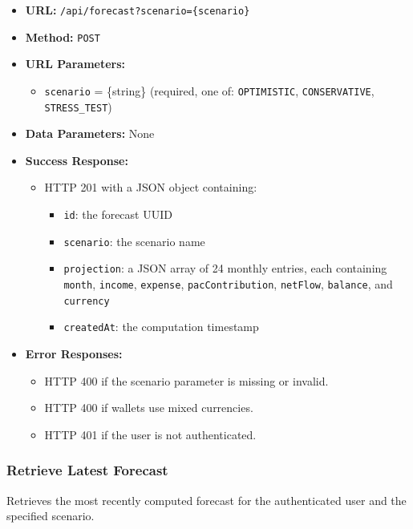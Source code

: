 \begin{itemize}
    \item \textbf{URL:} \texttt{/api/forecast?scenario=\{scenario\}}
    \item \textbf{Method:} \texttt{POST}
    \item \textbf{URL Parameters:}
    \begin{itemize}
        \item \texttt{scenario} = \{string\} (required, one of: \texttt{OPTIMISTIC}, \texttt{CONSERVATIVE}, \texttt{STRESS\_TEST})
    \end{itemize}
    \item \textbf{Data Parameters:} None
    \item \textbf{Success Response:}
    \begin{itemize}
        \item HTTP 201 with a JSON object containing:
        \begin{itemize}
            \item \texttt{id}: the forecast UUID
            \item \texttt{scenario}: the scenario name
            \item \texttt{projection}: a JSON array of 24 monthly entries, each containing \texttt{month}, \texttt{income}, \texttt{expense}, \texttt{pacContribution}, \texttt{netFlow}, \texttt{balance}, and \texttt{currency}
            \item \texttt{createdAt}: the computation timestamp
        \end{itemize}
    \end{itemize}
    \item \textbf{Error Responses:}
    \begin{itemize}
        \item HTTP 400 if the scenario parameter is missing or invalid.
        \item HTTP 400 if wallets use mixed currencies.
        \item HTTP 401 if the user is not authenticated.
    \end{itemize}
\end{itemize}

\subsubsection{Retrieve Latest Forecast}

Retrieves the most recently computed forecast for the authenticated user and the specified scenario.

